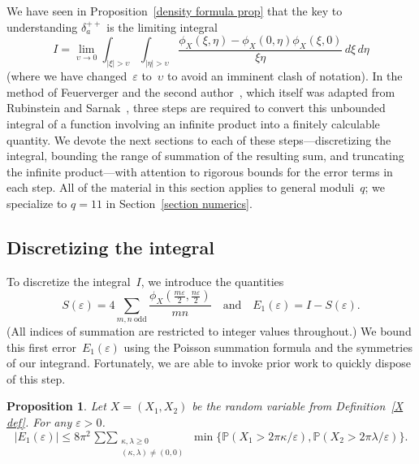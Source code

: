 \documentclass[11pt]{article}
\theoremstyle{plain}
\newtheorem{prop}[thm]{Proposition}
\theoremstyle{definition}
\numberwithin{equation}{section}
\newcommand{\Xva}{X}
\newcommand{\0}{{\vec 0}}
\begin{document}
We have seen in Proposition~\ref{density formula prop} that the key to understanding $\delta_a^{++}$ is the limiting integral
\begin{equation} \label{equation definition bias}
I=\lim_{\upsilon\rightarrow 0}\int_{|\xi|>\upsilon}\int_{|\eta|>\upsilon}\frac{\phi_X(\xi,\eta)-\phi_X(0,\eta)\phi_X(\xi,0)}{\xi\eta}\,d\xi\,d\eta
\end{equation}
(where we have changed~$\varepsilon$ to~$\upsilon$ to avoid an imminent clash of notation). In the method of Feuerverger and the second author~\cite{BSRPNR}, which itself was adapted from Rubinstein and Sarnak~\cite{RS94}, three steps are required to convert this unbounded integral of a function involving an infinite product into a finitely calculable quantity.
We devote the next sections to each of these steps---discretizing the integral, bounding the range of summation of the resulting sum, and truncating the infinite product---with attention to rigorous bounds for the error terms in each step. All of the material in this section applies to general moduli~$q$; we specialize to $q=11$ in Section~\ref{section numerics}.


\subsection{Discretizing the integral}

To discretize the integral~$I$, we introduce the quantities
\begin{equation} \label{E1 def}
S(\varepsilon) = 4 \sum_{m,n\ \text{odd}} \frac{\phi_X(\frac{m\varepsilon}{2},\frac{n\varepsilon}{2})}{mn}
\quad\text{and}\quad
E_1(\varepsilon) = I - S(\varepsilon).
\end{equation}
(All indices of summation are restricted to integer values throughout.)
We bound this first error~$E_1(\varepsilon)$ using the Poisson summation formula and the symmetries of our integrand. Fortunately, we are able to invoke prior work to quickly dispose of this step.

\begin{prop}\label{proposition summary FM E1}
Let $\Xva=(\Xva_1,\Xva_2)$ be the random variable from Definition~\ref{X def}.
For any $\varepsilon>0$.
\[
|E_1(\varepsilon)| \le 8\pi^2 \mathop{\sum\sum}_{\substack{\kappa,\lambda\ge0\\ 
(\kappa,\lambda)\neq(0,0)}} \min\bigl\{ \mathbb{P}(X_1>2\pi\kappa/\varepsilon), \mathbb{P}(X_2>2\pi\lambda/\varepsilon) \bigr\}.
\]
\end{prop}
\end{document}
